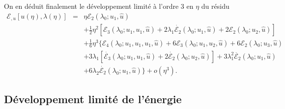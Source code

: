 \documentclass{article}
\newcommand{\nosymbol}{}
\begin{document}
On en d{\'e}duit finalement le d{\'e}veloppement limit{\'e} {\`a} l'ordre 3 en
$\eta$ du r{\'e}sidu
\begin{eqnarray}
  \mathcal{E}_{, u} [u (\eta), \lambda (\eta)] & = & \eta \mathcal{E}_2
  (\lambda_0 ; u_1, \hat{u}) \nonumber\\
  &  & \nosymbol + \tfrac{1}{2} \eta^2  [\mathcal{E}_3 (\lambda_0 ; u_1, u_1,
  \hat{u}) + 2 \lambda_1  \dot{\mathcal{E}_2} (\lambda_0 ; u_1, \hat{u}) +
  2\mathcal{E}_2 (\lambda_0 ; u_2, \hat{u})] \nonumber\\
  &  & \nosymbol + \tfrac{1}{6} \eta^3  \{ \mathcal{E}_4 (\lambda_0 ; u_1,
  u_1, u_1, \hat{u}) + 6\mathcal{E}_3 (\lambda_0 ; u_1, u_2, \hat{u})
   + 6\mathcal{E}_2 (\lambda_0 ; u_3, \hat{u}) \nonumber\\
  &  & \nosymbol + 3 \lambda_1  [\dot{\mathcal{E}_3} (\lambda_0 ; u_1, u_1,
  \hat{u}) + 2 \dot{\mathcal{E}_2} (\lambda_0 ; u_2, \hat{u})] + 3 \lambda_1^2
  \ddot{\mathcal{E}_2} (\lambda_0 ; u_1, \hat{u}) \nonumber\\
  &  &  \nosymbol + 6 \lambda_2  \dot{\mathcal{E}_2} (\lambda_0 ;
  u_1, \hat{u}) \} + o (\eta^3) .  \label{eq20220107080901}
\end{eqnarray}
\subsection{D{\'e}veloppement limit{\'e} de
l'{\'e}nergie}\label{sec20220121172919}
\end{document}
